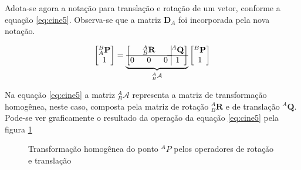     Adota-se agora a notação para translação e rotação de um vetor, conforme a equação \eqref{eq:cine5}. Observa-se que a matriz $\mathbf{D}_A$ foi incorporada pela nova notação.
    
    \begin{equation}\label{eq:cine5}
    \begin{bmatrix}
    {}^B_A\mathbf{P}\\ 1
    \end{bmatrix}
    =
    \underbrace {
    \left[
    \begin{matrix}
    & {}_B^A\mathbf{R}& \\ \hline
    0 & 0 & 0\\
    \end{matrix} \right.
    \left.
    \vline
    \begin{matrix}
    {}^A\mathbf{Q}\\ \hline
    1
    \end{matrix} \right]
    }_{{}^A_B\mathcal{A}}
    \begin{bmatrix}
    {}^B\mathbf{P}\\
    1
    \end{bmatrix}
    \end{equation}
    
    
    Na equação \eqref{eq:cine5} a matriz ${}^A_B\mathcal{A}$ representa a matriz de transformação homogênea, neste caso, composta pela matriz de rotação ${}^A_B \mathbf{R}$ e de translação ${}^A\mathbf{Q}$. Pode-se ver graficamente o resultado da operação da equação \eqref{eq:cine5} pela figura \ref{fig:cine2}
    
    \begin{figure}[!ht]
    \centering
    \caption{Transformação homogênea do ponto ${}^AP$ pelos operadores de rotação e translação}
    \label{fig:cine2}
    \end{figure}
    
